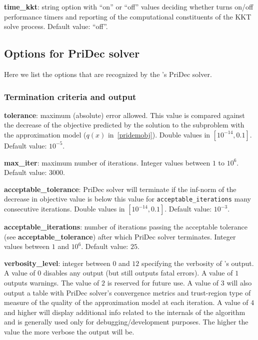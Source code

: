 \noindent \textbf{time\_kkt}: string option with ``on'' or ``off'' values deciding whether \Hi turns on/off performance timers and reporting of the computational constituents of the KKT solve process. Default value: ``off''.
\medskip



















\subsection{Options for PriDec solver}

Here we list the options that are recognized by the \Hi's PriDec solver.
 \subsubsection{Termination criteria and output}

 \noindent \textbf{tolerance}: maximum (absolute) error allowed. This value is compared against the decrease of the objective predicted by the solution to the subproblem with the approximation model ($q(x)$ in~\eqref{pridemobj}). Double values in $[10^{-14},0.1]$. Default value: $10^{-5}$.

  \medskip

  \noindent \textbf{max\_iter}: maximum number of iterations. Integer values between $1$ to $10^6$. Default value: $3000$.
  \medskip
  
  \noindent \textbf{acceptable\_tolerance}: PriDec solver will terminate if the inf-norm of the decrease in objective value is below this value for \texttt{acceptable\_iterations} many consecutive iterations. Double values in $[10^{-14},0.1]$. Default value: $10^{-3}$.

  \medskip

  \noindent \textbf{acceptable\_iterations}: number of iterations passing the acceptable tolerance (see \textbf{acceptable\_tolerance}) after which PriDec solver terminates. Integer values between $1$ and $10^6$. Default value: $25$.

  \medskip

 \noindent \textbf{verbosity\_level}: integer between $0$ and $12$ specifying the verbosity of \Hi's output. A value of $0$ disables any output (but still outputs fatal errors). A value of $1$ outputs warnings. The value of $2$ is reserved for future use. A value of $3$ will also output a table with PriDec solver's convergence metrics and trust-region type of measure of the quality of the approximation model at each iteration. A value of $4$ and higher will display additional info related to the internals of the algorithm and is generally used only for debugging/development purposes. The higher the value the more verbose the output will be.


